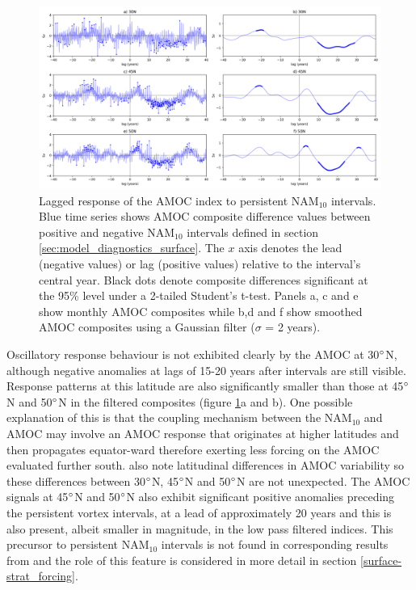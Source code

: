 \begin{figure}[h!]
\begin{center}
\noindent\includegraphics[width = \linewidth]{Figures/Figures-surface/AMOC_responses_low_and_highf_combined_FINAL.png} 
\caption[Lagged response of the AMOC index to persistent NAM$_{10}$ intervals.]{Lagged response of the AMOC index to persistent NAM$_{10}$ intervals. Blue time series shows AMOC composite difference values between positive and negative NAM$_{10}$ intervals defined in section \ref{sec:model_diagnostics_surface}. The $x$ axis denotes the lead (negative values) or lag (positive values) relative to the interval's central year. Black dots denote composite differences significant at the 95\% level under a 2-tailed Student's t-test. Panels a, c and e show monthly AMOC composites while b,d and f show smoothed AMOC composites using a Gaussian filter ($\sigma$ = 2 years).}
\label{AMOC_comp_NAM}
\end{center}
\end{figure}

Oscillatory response behaviour is not exhibited clearly by the AMOC at 30$\degree$N, although negative anomalies at lags of 15-20 years after intervals are still visible. Response patterns at this latitude are also significantly smaller than those at 45$\degree$N and 50$\degree$N in the filtered composites (figure \ref{AMOC_comp_NAM}a and b). One possible explanation of this is that the coupling mechanism between the NAM$_{10}$ and AMOC may involve an AMOC response that originates at higher latitudes and then propagates equator-ward therefore exerting less forcing on the AMOC evaluated further south. \cite{zhangLatitudinal2010b} also note latitudinal differences in AMOC variability so these differences between 30$\degree$N, 45$\degree$N and 50$\degree$N are not unexpected. The AMOC signals at 45$\degree$N and 50$\degree$N also exhibit significant positive anomalies preceding the persistent vortex intervals, at a lead of approximately 20 years and this is also present, albeit smaller in magnitude, in the low pass filtered indices. This precursor to persistent NAM$_{10}$ intervals is not found in corresponding results from \cite{reichlerStratospheric2012b} and the role of this feature is considered in more detail in section \ref{surface-strat_forcing}.

